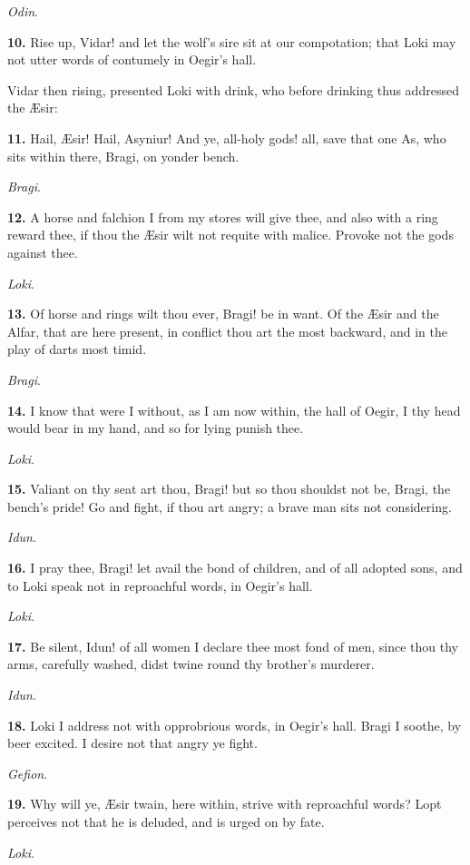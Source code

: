 \emph{Odin}.

\textbf{10.} Rise up, Vidar! and let the wolf's sire sit at our compotation;
that Loki may not utter words of contumely in Oegir's hall.

Vidar then rising, presented Loki with drink, who before drinking thus
addressed the Æsir:

\textbf{11.} Hail, Æsir! Hail, Asyniur! And ye, all-holy gods! all, save that
one As, who sits within there, Bragi, on yonder bench.

\emph{Bragi}.

\textbf{12.} A horse and falchion I from my stores will give thee, and also
with a ring reward thee, if thou the Æsir wilt not requite with
malice. Provoke not the gods against thee.

\emph{Loki}.

\textbf{13.} Of horse and rings wilt thou ever, Bragi! be in want. Of the
Æsir and the Alfar, that are here present, in conflict thou art the
most backward, and in the play of darts most timid.

\emph{Bragi}.

\textbf{14.} I know that were I without, as I am now within, the hall of
Oegir, I thy head would bear in my hand, and so for lying punish thee.

\emph{Loki}.

\textbf{15.} Valiant on thy seat art thou, Bragi! but so thou shouldst not
be, Bragi, the bench's pride! Go and fight, if thou art angry; a brave
man sits not considering.

\emph{Idun}.

\textbf{16.} I pray thee, Bragi! let avail the bond of children, and of all
adopted sons, and to Loki speak not in reproachful words, in Oegir's
hall.

\emph{Loki}.

\textbf{17.} Be silent, Idun! of all women I declare thee most fond of men,
since thou thy arms, carefully washed, didst twine round thy brother's
murderer.

\emph{Idun}.

\textbf{18.} Loki I address not with opprobrious words, in Oegir's hall.
Bragi I soothe, by beer excited. I desire not that angry ye fight.

\emph{Gefion}.

\textbf{19.} Why will ye, Æsir twain, here within, strive with reproachful
words? Lopt perceives not that he is deluded, and is urged on by fate.

\emph{Loki}.

